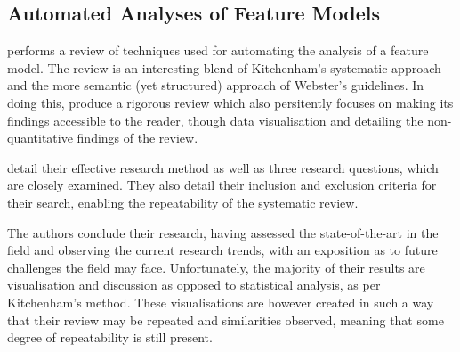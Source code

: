\subsection{Automated Analyses of Feature Models}
\citet*{Benavides} performs a review of techniques used for automating the analysis of a feature model. The review is an interesting blend of Kitchenham's systematic approach and the more semantic (yet structured) approach of Webster's guidelines. In doing this, \citeauthor{Benavides} produce a rigorous review which also persitently focuses on making its findings accessible to the reader, though data visualisation and detailing the non-quantitative findings of the review.\par

\citeauthor{Benavides} detail their effective research method as well as three research questions, which are closely examined. They also detail their inclusion and exclusion criteria for their search, enabling the repeatability of the systematic review. \par

The authors conclude their research, having assessed the state-of-the-art in the field and observing the current research trends, with an exposition as to future challenges the field may face. Unfortunately, the majority of their results are visualisation and discussion as opposed to statistical analysis, as per Kitchenham's method. These visualisations are however created in such a way that their review may be repeated and similarities observed, meaning that some degree of repeatability is still present.\par
